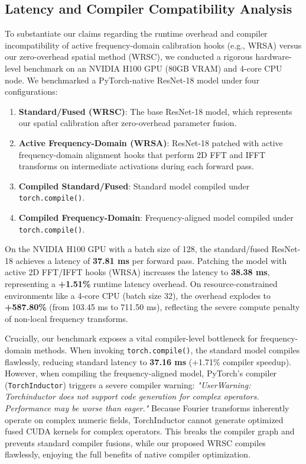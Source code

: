 \documentclass{article}
\theoremstyle{plain}
\theoremstyle{definition}
\theoremstyle{remark}
\begin{document}
\subsection{Latency and Compiler Compatibility Analysis}
To substantiate our claims regarding the runtime overhead and compiler incompatibility of active frequency-domain calibration hooks (e.g., WRSA) versus our zero-overhead spatial method (WRSC), we conducted a rigorous hardware-level benchmark on an NVIDIA H100 GPU (80GB VRAM) and 4-core CPU node. We benchmarked a PyTorch-native ResNet-18 model under four configurations:
\begin{enumerate}
    \item \textbf{Standard/Fused (WRSC)}: The base ResNet-18 model, which represents our spatial calibration after zero-overhead parameter fusion.
    \item \textbf{Active Frequency-Domain (WRSA)}: ResNet-18 patched with active frequency-domain alignment hooks that perform 2D FFT and IFFT transforms on intermediate activations during each forward pass.
    \item \textbf{Compiled Standard/Fused}: Standard model compiled under \texttt{torch.compile()}.
    \item \textbf{Compiled Frequency-Domain}: Frequency-aligned model compiled under \texttt{torch.compile()}.
\end{enumerate}

On the NVIDIA H100 GPU with a batch size of 128, the standard/fused ResNet-18 achieves a latency of \textbf{37.81 ms} per forward pass. Patching the model with active 2D FFT/IFFT hooks (WRSA) increases the latency to \textbf{38.38 ms}, representing a \textbf{+1.51\%} runtime latency overhead. On resource-constrained environments like a 4-core CPU (batch size 32), the overhead explodes to \textbf{+587.80\%} (from 103.45 ms to 711.50 ms), reflecting the severe compute penalty of non-local frequency transforms.

Crucially, our benchmark exposes a vital compiler-level bottleneck for frequency-domain methods. When invoking \texttt{torch.compile()}, the standard model compiles flawlessly, reducing standard latency to \textbf{37.16 ms} (+1.71\% compiler speedup). However, when compiling the frequency-aligned model, PyTorch's compiler (\texttt{TorchInductor}) triggers a severe compiler warning: \textit{"UserWarning: Torchinductor does not support code generation for complex operators. Performance may be worse than eager."} Because Fourier transforms inherently operate on complex numeric fields, TorchInductor cannot generate optimized fused CUDA kernels for complex operators. This breaks the compiler graph and prevents standard compiler fusions, while our proposed WRSC compiles flawlessly, enjoying the full benefits of native compiler optimization.
\end{document}
